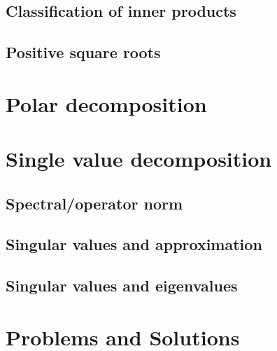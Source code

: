 \documentclass{article}
\theoremstyle{definition}
\begin{document}
\subsection{Classification of inner products}
\subsection{Positive square roots}
\newpage 

\section{Polar decomposition}
\newpage 

\section{Single value decomposition}
\subsection{Spectral/operator norm}
\subsection{Singular values and approximation}
\subsection{Singular values and eigenvalues}







































\newpage
\section{Problems and Solutions}
\end{document}
